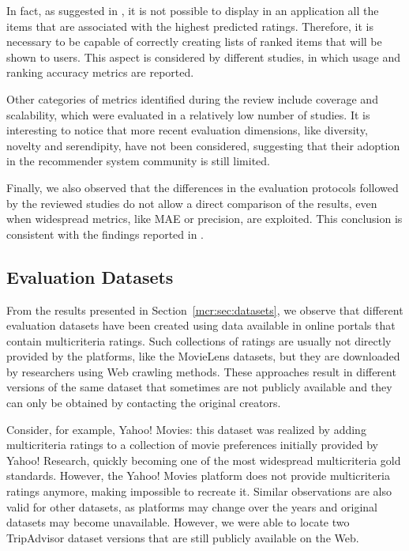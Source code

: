 In fact, as suggested in \cite{Herlocker2000}, it is not possible to display in an application all the items that are associated with the highest predicted ratings. Therefore, it is necessary to be capable of correctly creating lists of ranked items that will be shown to users. This aspect is considered by different studies, in which usage and ranking accuracy metrics are reported.

Other categories of metrics identified during the review include coverage and scalability, which were evaluated in a relatively low number of studies. It is interesting to notice that more recent evaluation dimensions, like diversity, novelty and serendipity, have not been considered, suggesting that their adoption in the recommender system community is still limited.

Finally, we also observed that the differences in the evaluation protocols followed by the reviewed studies do not allow a direct comparison of the results, even when widespread metrics, like MAE or precision, are exploited. This conclusion is consistent with the findings reported in \cite{Said2014}.

\subsection{Evaluation Datasets}

From the results presented in Section~\ref{mcr:sec:datasets}, we observe that different evaluation datasets have been created using data available in online portals that contain multicriteria ratings. Such collections of ratings are usually not directly provided by the platforms, like the MovieLens datasets, but they are downloaded by researchers using Web crawling methods. These approaches result in different versions of the same dataset that sometimes are not publicly available and they can only be obtained by contacting the original creators.

Consider, for example, Yahoo! Movies: this dataset was realized by adding multicriteria ratings to a collection of movie preferences initially provided by Yahoo! Research, quickly becoming one of the most widespread multicriteria gold standards. However, the Yahoo! Movies platform does not provide multicriteria ratings anymore, making impossible to recreate it. Similar observations are also valid for other datasets, as platforms may change over the years and original datasets may become unavailable. However, we were able to locate two TripAdvisor dataset versions that are still publicly available on the Web.

